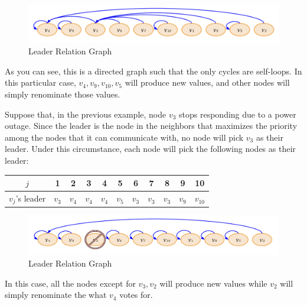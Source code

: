 \begin{exmp}
    \begin{figure}[!htb]
        \includegraphics[width=.8\linewidth]{img/leader_election.jpeg}
        \caption{Leader Relation Graph}
        \label{fig:leader_relation}
    \end{figure}

    As you can see, this is a directed graph such that the only cycles are self-loops.
    In this particular case, $v_4, v_9, v_{10}, v_5$ will produce new values, and other nodes will simply renominate those values.
\end{exmp}

\begin{exmp}
    Suppose that, in the previous example, node $v_3$ stops responding due to a power outage.
    Since the leader is the node in the neighbors that maximizes the priority among the nodes that it can communicate with, no node will pick $v_3$ as their leader.
    Under this circumstance, each node will pick the following nodes as their leader:

    \begin{center}
      \begin{tabular}{ | c | c | c | c | c | c | c | c | c | c | c | }
        \hline
            $j$ & 1 & 2 & 3 & 4 & 5 & 6 & 7 & 8 & 9 & 10 \\ \hline
            $v_j$'s leader & $v_3$ & $v_4$ & $v_4$ & $v_4$ & $v_5$ & $v_3$ & $v_3$ & $v_3$ & $v_9$ & $v_{10}$ \\
        \hline
      \end{tabular}
    \end{center}

    \begin{figure}[!htb]
        \includegraphics[width=.8\linewidth]{img/leader_election_with_failed_node.jpeg}
        \caption{Leader Relation Graph}
        \label{fig:leader_relation_with_failed_node}
    \end{figure}
    
    In this case, all the nodes except for $v_3, v_2$ will produce new values while $v_2$ will simply renominate the what $v_4$ votes for.
\end{exmp}

